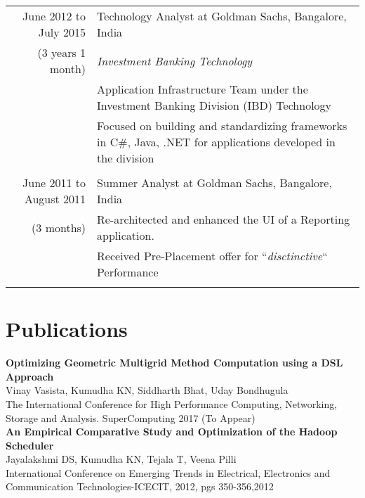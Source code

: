 \documentclass[a4paper,10pt]{article} %
\begin{document}
\begin{tabular}{r|p{10cm}}
June 2012 to July 2015 & Technology Analyst at Goldman Sachs, Bangalore, India \\
{(3 years 1 month)}& \emph{Investment Banking Technology}\\ 
& \small {Application Infrastructure Team under the Investment Banking Division (IBD) Technology} \\
& \small {Focused on building and standardizing frameworks in C\#, Java, .NET for
applications developed in the division}\\
& \\

June 2011 to August 2011 & Summer Analyst at Goldman Sachs, Bangalore, India \\
{(3 months)}& \small{Re-architected and enhanced the UI of a Reporting application.}\\
& \small{ Received Pre-Placement offer for ``\emph{disctinctive}`` Performance }\\
& \\

\end{tabular}

\newpage

\section{Publications}
\textbf{Optimizing Geometric Multigrid Method Computation using a DSL Approach}\\
\small{Vinay Vasista, Kumudha KN, Siddharth Bhat, Uday Bondhugula} \\
\small{The International Conference for High Performance Computing, Networking, Storage and Analysis. SuperComputing 2017 (To Appear)} \\


\textbf{An Empirical Comparative Study and Optimization of the Hadoop Scheduler} \\
\small{Jayalakshmi DS, Kumudha KN, Tejala T, Veena Pilli}\\
\small{International Conference on Emerging Trends in Electrical, Electronics and 
Communication Technologies-ICECIT, 2012, pgs 350-356,2012}
\\
\\
\end{document}
